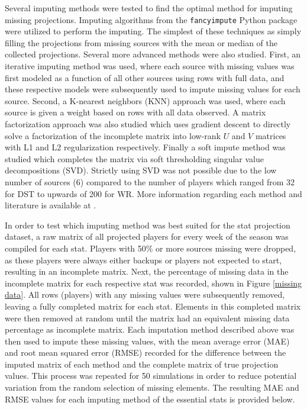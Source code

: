 \documentclass[12pt]{article}
\begin{document}
Several imputing methods were tested to find the optimal method for imputing missing projections. Imputing algorithms from the \texttt{fancyimpute} Python package were utilized to perform the imputing\cite{fancyimpute}. The simplest of these techniques as simply filling the projections from missing sources with the mean or median of the collected projections. Several more advanced methods were also studied. First, an iterative imputing method was used, where each source with missing values was first modeled as a function of all other sources using rows with full data, and these respective models were subsequently used to impute missing values for each source. Second, a K-nearest neighbors (KNN) approach was used, where each source is given a weight based on rows with all data observed. A matrix factorization approach was also studied which uses gradient descent to directly solve a factorization of the incomplete matrix into low-rank $U$ and $V$ matrices with L1 and L2 regularization respectively. Finally a soft impute method was studied which completes the matrix via soft thresholding singular value decompositions (SVD). Strictly using SVD was not possible due to the low number of sources (6) compared to the number of players which ranged from 32 for DST to upwards of 200 for WR. More information regarding each method and literature is available at \cite{fancyimpute}.\bigskip

In order to test which imputing method was best suited for the stat projection dataset, a raw matrix of all projected players for every week of the season was compiled for each stat. Players with 50\% or more sources missing were dropped, as these players were always either backups or players not expected to start, resulting in an incomplete matrix. Next, the percentage of missing data in the incomplete matrix for each respective stat was recorded, shown in Figure \ref{missing data}. All rows (players) with any missing values were subsequently removed, leaving a fully completed matrix for each stat. Elements in this completed matrix were then removed at random until the matrix had an equivalent missing data percentage as incomplete matrix. Each imputation method described above was then used to impute these missing values, with the mean average error (MAE) and root mean squared error (RMSE) recorded for the difference between the imputed matrix of each method and the complete matrix of true projection values. This process was repeated for 50 simulations in order to reduce potential variation from the random selection of missing elements. The resulting MAE and RMSE values for each imputing method of the essential stats is provided below. 
\end{document}
